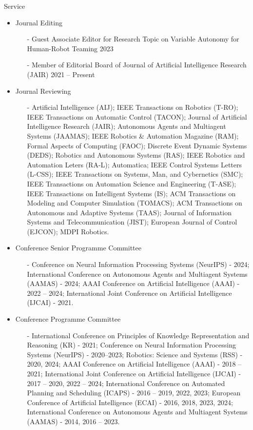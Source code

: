 \begin{rSection}{Service}
\begin{itemize}
\item Journal Editing
\begin{itemize}
\item[-] Guest Associate Editor for Research Topic on Variable Autonomy for \\ Human-Robot Teaming \hfill 2023
\item[-] Member of Editorial Board of Journal of Artificial Intelligence Research\\ (JAIR) \hfill 2021 -- Present 
\end{itemize}

\item Journal Reviewing
\begin{itemize}
\item[-]  Artificial Intelligence (AIJ); IEEE Transactions on Robotics (T-RO); IEEE Transactions on Automatic Control (TACON); Journal of Artificial Intelligence Research (JAIR); Autonomous Agents and Multiagent Systems (JAAMAS); IEEE Robotics \& Automation Magazine (RAM); Formal Aspects of Computing (FAOC); Discrete Event Dynamic Systems (DEDS); Robotics and Autonomous Systems (RAS); IEEE Robotics and Automation Leters (RA-L); Automatica; IEEE Control Systems Letters (L-CSS);  IEEE Transactions on Systems, Man, and Cybernetics (SMC);  IEEE Transactions on Automation Science and Engineering (T-ASE); IEEE Transactions on Intelligent Systems (IS); ACM Transactions on Modeling and Computer Simulation (TOMACS); ACM Transactions on Autonomous and Adaptive Systems (TAAS); Journal of Information Systems and Telecommunication (JIST); European Journal of Control  (EJCON); MDPI Robotics.
\end{itemize}


\item{Conference Senior Programme Committee}
\begin{itemize}
\item[-] Conference on Neural Information Processing Systems (NeurIPS) - 2024; International Conference on Autonomous Agents and Multiagent Systems (AAMAS) - 2024; AAAI Conference on Artificial Intelligence (AAAI) - 2022 -- 2024; International Joint Conference on Artificial Intelligence (IJCAI) - 2021.
\end{itemize}

\item{Conference Programme Committee}
\begin{itemize}
\vspace*{-0.2cm}
\item[-]  International Conference on Principles of Knowledge Representation and Reasoning (KR) - 2021; Conference on Neural Information Processing Systems (NeurIPS) - 2020--2023; Robotics: Science and Systems (RSS) - 2020, 2024; AAAI Conference on Artificial Intelligence (AAAI) - 2018 -- 2021; International Joint Conference on Artificial Intelligence (IJCAI) - 2017 -- 2020, 2022 -- 2024; International Conference on Automated Planning and Scheduling (ICAPS) - 2016 -- 2019, 2022, 2023;  European Conference of Artificial Intelligence (ECAI) - 2016, 2018, 2023, 2024; International Conference on Autonomous Agents and Multiagent Systems (AAMAS) - 2014, 2016 -- 2023.
\end{itemize}


\end{itemize}
\end{rSection}
